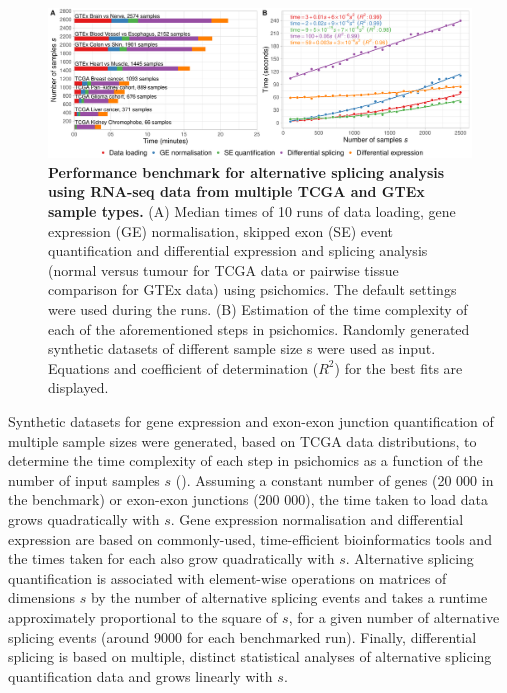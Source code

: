 \begin{figure}[!ht]
  \includegraphics[width=1\textwidth]{images/psichomics/performance-benchmark}
  \centering
  \caption[Performance benchmark for alternative splicing analysis]{\textbf{Performance benchmark for alternative splicing analysis using RNA-seq data from multiple TCGA and GTEx sample types.} (A) Median times of 10 runs of data loading, gene expression (GE) normalisation, skipped exon (SE) event quantification and differential expression and splicing analysis (normal versus tumour for TCGA data or pairwise tissue comparison for GTEx data) using psichomics. The default settings were used during the runs. (B) Estimation of the time complexity of each of the aforementioned steps in psichomics. Randomly generated synthetic datasets of different sample size s were used as input. Equations and coefficient of determination ($R^2$) for the best fits are displayed.}
  \label{fig:psichomics-performance}
\end{figure}

Synthetic datasets for gene expression and exon-exon junction quantification of multiple sample sizes were generated, based on TCGA data distributions, to determine the time complexity of each step in psichomics as a function of the number of input samples $s$ (). Assuming a constant number of genes (20 000 in the benchmark) or exon-exon junctions (200 000), the time taken to load data grows quadratically with $s$. Gene expression normalisation and differential expression are based on commonly-used, time-efficient bioinformatics tools and the times taken for each also grow quadratically with $s$. Alternative splicing quantification is associated with element-wise operations on matrices of dimensions $s$ by the number of alternative splicing events and takes a runtime approximately proportional to the square of $s$, for a given number of alternative splicing events (around 9000 for each benchmarked run). Finally, differential splicing is based on multiple, distinct statistical analyses of alternative splicing quantification data and grows linearly with $s$.

